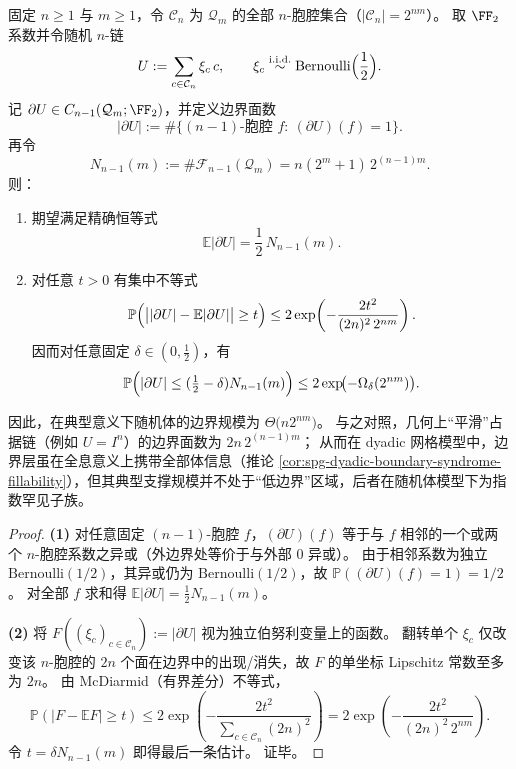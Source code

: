 \begin{theorem}\label{thm:spg-random-bulk-boundary-saturation}
固定 \(n\ge 1\) 与 \(m\ge 1\)，令 \(\mathcal C_n\) 为 \(\mathcal Q_m\) 的全部 \(n\)-胞腔集合（\(|\mathcal C_n|=2^{nm}\)）。
取 \(\FF_2\) 系数并令随机 \(n\)-链
\[
U:=\sum_{c\in\mathcal C_n}\xi_c\,c,
\qquad
\xi_c\overset{\mathrm{i.i.d.}}{\sim}\mathrm{Bernoulli}\Bigl(\frac12\Bigr).
\]
记 \(\partial U\in C_{n-1}(\mathcal Q_m;\FF_2)\)，并定义边界面数
\[
|\partial U|
:=\#\{\text{\((n-1)\)-胞腔 }f:\ (\partial U)(f)=1\}.
\]
再令
\[
N_{n-1}(m):=\#\mathcal F_{n-1}(\mathcal Q_m)=n(2^m+1)\,2^{(n-1)m}.
\]
则：
\begin{enumerate}
\normalfont
  \item 期望满足精确恒等式
  \[
  \mathbb E|\partial U|=\frac12\,N_{n-1}(m).
  \]
  \item 对任意 \(t>0\) 有集中不等式
  \[
  \mathbb P\Bigl(\bigl||\partial U|-\mathbb E|\partial U|\bigr|\ge t\Bigr)
  \le
  2\exp\!\left(-\frac{2t^2}{(2n)^2\,2^{nm}}\right).
  \]
  因而对任意固定 \(\delta\in(0,\tfrac12)\)，有
  \[
  \mathbb P\Bigl(|\partial U|\le (\tfrac12-\delta)N_{n-1}(m)\Bigr)
  \le
  2\exp\!\bigl(-\Omega_\delta(2^{nm})\bigr).
  \]
\end{enumerate}
因此，在典型意义下随机体的边界规模为 \(\Theta\!\bigl(n2^{nm}\bigr)\)。
与之对照，几何上“平滑”占据链（例如 \(U=I^n\)）的边界面数为 \(2n\,2^{(n-1)m}\)；
从而在 dyadic 网格模型中，边界层虽在全息意义上携带全部体信息（推论 \ref{cor:spg-dyadic-boundary-syndrome-fillability}），但其典型支撑规模并不处于“低边界”区域，后者在随机体模型下为指数罕见子族。
\end{theorem}
\begin{proof}
\textbf{(1)}
对任意固定 \((n-1)\)-胞腔 \(f\)，\((\partial U)(f)\) 等于与 \(f\) 相邻的一个或两个 \(n\)-胞腔系数之异或（外边界处等价于与外部 \(0\) 异或）。
由于相邻系数为独立 \(\mathrm{Bernoulli}(1/2)\)，其异或仍为 \(\mathrm{Bernoulli}(1/2)\)，故 \(\mathbb P((\partial U)(f)=1)=1/2\)。
对全部 \(f\) 求和得 \(\mathbb E|\partial U|=\frac12 N_{n-1}(m)\)。
\par
\textbf{(2)}
将 \(F((\xi_c)_{c\in\mathcal C_n}):=|\partial U|\) 视为独立伯努利变量上的函数。
翻转单个 \(\xi_c\) 仅改变该 \(n\)-胞腔的 \(2n\) 个面在边界中的出现/消失，故 \(F\) 的单坐标 Lipschitz 常数至多为 \(2n\)。
由 McDiarmid（有界差分）不等式，
\[
\mathbb P(|F-\mathbb EF|\ge t)\le 2\exp\!\left(-\frac{2t^2}{\sum_{c\in\mathcal C_n}(2n)^2}\right)
=2\exp\!\left(-\frac{2t^2}{(2n)^2\,2^{nm}}\right).
\]
令 \(t=\delta N_{n-1}(m)\) 即得最后一条估计。
证毕。
\end{proof}

